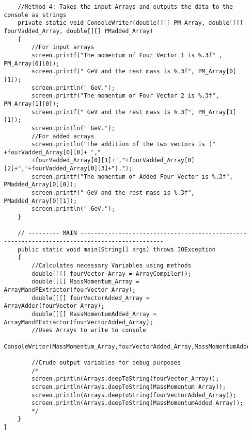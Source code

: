 \documentclass{article}
\begin{document}
\begin{lstlisting}
	//Method 4: Takes the input Arrays and outputs the data to the console as strings
	private static void ConsoleWriter(double[][] PM_Array, double[][] fourVadded_Array, double[][] PMadded_Array)
	{
		//For input arrays
		screen.printf("The momentum of Four Vector 1 is %.3f" , PM_Array[0][0]);
		screen.printf(" GeV and the rest mass is %.3f", PM_Array[0][1]);
		screen.println(" GeV.");
		screen.printf("The momentum of Four Vector 2 is %.3f", PM_Array[1][0]); 
		screen.printf(" GeV and the rest mass is %.3f", PM_Array[1][1]);
		screen.println(" GeV.");
		//For added arrays
		screen.println("The addition of the two vectors is (" +fourVadded_Array[0][0]+ ","
		+fourVadded_Array[0][1]+","+fourVadded_Array[0][2]+","+fourVadded_Array[0][3]+").");
		screen.printf("The momentum of Added Four Vector is %.3f", PMadded_Array[0][0]); 
		screen.printf(" GeV and the rest mass is %.3f", PMadded_Array[0][1]);
		screen.println(" GeV.");
	}
	
	// --------- MAIN ----------------------------------------------------------------------------------------------
	public static void main(String[] args) throws IOException
	{
		//Calculates necessary Variables using methods
		double[][] fourVector_Array = ArrayCompiler();
		double[][] MassMomentum_Array = ArrayMandPExtractor(fourVector_Array);
		double[][] fourVectorAdded_Array = ArrayAdder(fourVector_Array);
		double[][] MassMomentumAdded_Array = ArrayMandPExtractor(fourVectorAdded_Array);
		//Uses Arrays to write to console
		ConsoleWriter(MassMomentum_Array,fourVectorAdded_Array,MassMomentumAdded_Array);
		
		//Crude output variables for debug purposes
		/*
		screen.println(Arrays.deepToString(fourVector_Array));
		screen.println(Arrays.deepToString(MassMomentum_Array));
		screen.println(Arrays.deepToString(fourVectorAdded_Array));
		screen.println(Arrays.deepToString(MassMomentumAdded_Array));
		*/
	}
}
\end{lstlisting}
\end{document}
